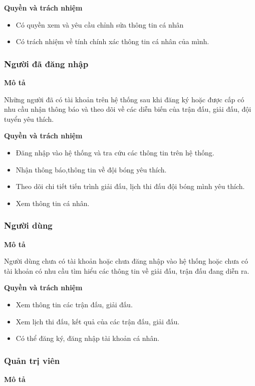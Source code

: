 \noindent
\textbf{Quyền và trách nhiệm}
\begin{itemize}[leftmargin=1.5cm, label={\textbf{--}}]
  \item Có quyền xem và yêu cầu chỉnh sửa thông tin cá nhân
  \item Có trách nhiệm về tính chính xác thông tin cá nhân của mình.
\end{itemize}

\subsubsection{Người đã đăng nhập}
\noindent
\textbf{Mô tả}

Những người đã có tài khoản trên hệ thống sau khi đăng ký hoặc
được cấp có nhu cầu nhận thông báo và theo dõi về các diễn biến của trận đấu,
giải đấu, đội tuyển yêu thích.

\noindent
\textbf{Quyền và trách nhiệm}
\begin{itemize}[leftmargin=1.5cm, label={\textbf{--}}]
  \item Đăng nhập vào hệ thống và tra cứu các thông tin trên hệ thống.
  \item Nhận thông báo,thông tin về đội bóng yêu thích.
  \item Theo dõi chi tiết  tiến trình giải đấu, lịch thi đấu đội bóng mình yêu thích.
  \item Xem thông tin cá nhân.
\end{itemize}

\subsubsection{Người dùng}
\noindent
\textbf{Mô tả}

Người dùng chưa có tài khoản hoặc chưa đăng nhập vào hệ thống hoặc chưa có tài khoản
có nhu cầu tìm hiểu các thông tin về giải đấu, trận đấu đang diễn ra.

\noindent
\textbf{Quyền và trách nhiệm}
\begin{itemize}[leftmargin=1.5cm, label={\textbf{--}}]
  \item Xem thông tin các trận đấu, giải đấu.
  \item Xem lịch thi đấu, kết quả của các trận đấu, giải đấu.
  \item Có thể đăng ký, đăng nhập tài khoản cá nhân.
\end{itemize}

\subsubsection{Quản trị viên}
\noindent
\textbf{Mô tả}

